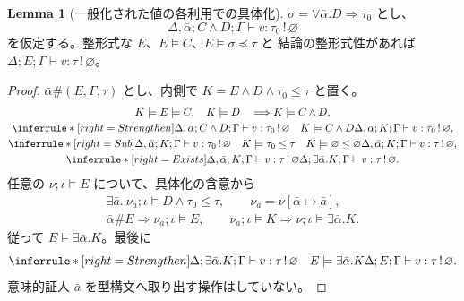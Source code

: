 \documentclass[a4paper,11pt]{article}
\theoremstyle{definition}
\newtheorem{lemma}[definition]{Lemma}
\newcommand{\emp}{\varnothing}
\newcommand{\jj}[6]{#1;#2;#3\vdash #4:#5\,!\,#6}
\newcommand{\inst}[2]{#1\preccurlyeq #2}
\newcommand{\proofspace}{\Needspace{16\baselineskip}}
\begin{document}
\proofspace
\begin{samepage}
\begin{lemma}[一般化された値の各利用での具体化]\label{lem:scheme-inst}
$\sigma=\forall\bar\alpha.D\Rightarrow\tau_0$ とし、
\[
 \jj{\Delta,\bar\alpha}{C\land D}\Gamma v{\tau_0}\emp
\]
を仮定する。整形式な $E$、$E\models C$、$E\models\inst\sigma\tau$ と
結論の整形式性があれば $\jj\Delta E\Gamma v\tau\emp$。
\end{lemma}
\end{samepage}
\nopagebreak[4]
\begin{proof}\leavevmode\label{proof:lem:scheme-inst}
$\bar\alpha\#(E,\Gamma,\tau)$ とし、内側で $K=E\land D\land\tau_0\leq\tau$ と置く。
\begin{gather*}
 K\models E\models C,\quad K\models D\quad\Longrightarrow K\models C\land D,\\
 \inferrule*[right=Strengthen]{\jj{\Delta,\bar\alpha}{C\land D}\Gamma v{\tau_0}\emp
                    \quad K\models C\land D}
                    {\jj{\Delta,\bar\alpha}K\Gamma v{\tau_0}\emp},\\
 \inferrule*[right=Sub]{\jj{\Delta,\bar\alpha}K\Gamma v{\tau_0}\emp
               \quad K\models\tau_0\leq\tau\quad K\models\emp\leq\emp}
               {\jj{\Delta,\bar\alpha}K\Gamma v\tau\emp},\\
 \inferrule*[right=Exists]{\jj{\Delta,\bar\alpha}K\Gamma v\tau\emp}
                    {\jj\Delta{\exists\bar\alpha.K}\Gamma v\tau\emp}.
\end{gather*}
任意の $\nu;\iota\models E$ について、具体化の含意から
\begin{gather*}
 \exists\bar a.\ \nu_a;\iota\models D\land\tau_0\leq\tau,
 \qquad\nu_a=\nu[\bar\alpha\mapsto\bar a],\\
 \bar\alpha\#E\Longrightarrow\nu_a;\iota\models E,
 \qquad\nu_a;\iota\models K\Longrightarrow\nu;\iota\models\exists\bar\alpha.K.
\end{gather*}
従って $E\models\exists\bar\alpha.K$。最後に
\[
 \inferrule*[right=Strengthen]{\jj\Delta{\exists\bar\alpha.K}\Gamma v\tau\emp
                      \quad E\models\exists\bar\alpha.K}
                      {\jj\Delta E\Gamma v\tau\emp}.
\]
意味的証人 $\bar a$ を型構文へ取り出す操作はしていない。
\end{proof}
\end{document}
